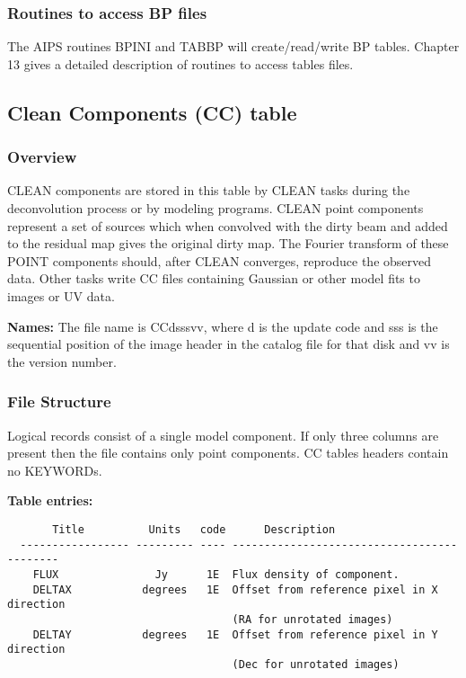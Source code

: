 \subsubsection{Routines to access BP files}
     The AIPS routines BPINI and TABBP will
create/read/write BP tables.  Chapter 13 gives a detailed description
of routines to access tables files.


\subsection{Clean Components (CC) table}

\subsubsection{Overview}

CLEAN components are stored in this table by CLEAN tasks during the
deconvolution process or by modeling programs.  CLEAN point components
represent a set of sources which when convolved with the dirty beam
and added to the residual map gives the original dirty map.  The
Fourier transform of these POINT components should, after CLEAN
converges, reproduce the observed data.  Other tasks write CC files
containing Gaussian or other model fits to images or UV data.



{\bf Names:} The file name is CCdsssvv, where d is the update code and
sss is the sequential position of the image header in the catalog file
for that disk and vv is the version number.


\subsubsection{File Structure}

     Logical records consist of a single model component.  If only three
columns are present then the file contains only point components.
CC tables headers contain no KEYWORDs.

{\bf Table entries:}

\begin{verbatim}
       Title          Units   code      Description
  ----------------- --------- ---- -------------------------------------------
    FLUX               Jy      1E  Flux density of component.
    DELTAX           degrees   1E  Offset from reference pixel in X direction
                                   (RA for unrotated images)
    DELTAY           degrees   1E  Offset from reference pixel in Y direction
                                   (Dec for unrotated images)
\end{verbatim}

